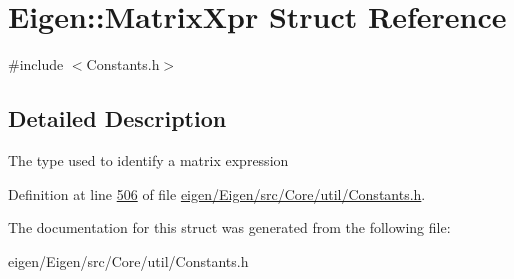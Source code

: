 \hypertarget{struct_eigen_1_1_matrix_xpr}{}\section{Eigen\+:\+:Matrix\+Xpr Struct Reference}
\label{struct_eigen_1_1_matrix_xpr}


{\ttfamily \#include $<$Constants.\+h$>$}



\subsection{Detailed Description}
The type used to identify a matrix expression 

Definition at line \hyperlink{eigen_2_eigen_2src_2_core_2util_2_constants_8h_source_l00506}{506} of file \hyperlink{eigen_2_eigen_2src_2_core_2util_2_constants_8h_source}{eigen/\+Eigen/src/\+Core/util/\+Constants.\+h}.



The documentation for this struct was generated from the following file\+:\begin{DoxyCompactItemize}
\item 
eigen/\+Eigen/src/\+Core/util/\+Constants.\+h\end{DoxyCompactItemize}
